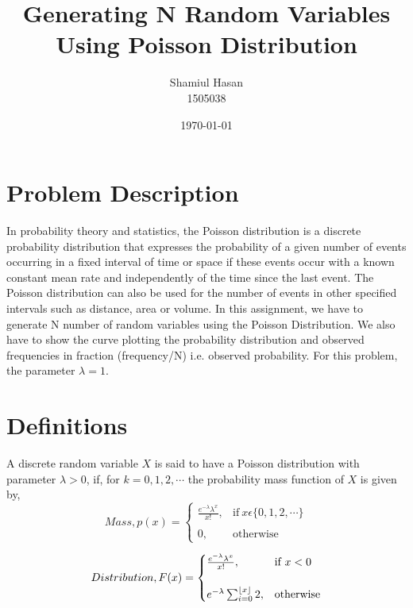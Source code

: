 \documentclass[12pt]{article}
\DeclarePairedDelimiter\floor{\lfloor}{\rfloor}
\begin{document}
\title{Generating N Random Variables Using Poisson Distribution}
\author{Shamiul Hasan\\1505038}
\date{\today}
\maketitle


\section{Problem Description}
In probability theory and statistics, the Poisson distribution is a discrete probability distribution that expresses the probability of a given number of events occurring in a fixed interval of time or space if these events occur with a known constant mean rate and independently of the time since the last event. The Poisson distribution can also be used for the number of events in other specified intervals such as distance, area or volume.
In this assignment, we have to generate N number of random variables using the Poisson Distribution. We also have to show the curve plotting the probability distribution and observed frequencies in fraction (frequency/N) i.e. observed probability. For this problem, the parameter $\lambda = 1$.


\section{Definitions}

A discrete random variable $X$ is said to have a Poisson distribution with parameter $\lambda > 0$, if, for $k = 0, 1, 2, \cdots$ the probability mass function of $X$ is given by, \\

\begin{equation}
	Mass, p(x)=
	\begin{cases}
		{\frac {e^{-\lambda}\lambda ^{x}}{x!}}, & \text{if}\ x \epsilon \{0,1,2,\cdots\} \\ \\
		0,                                      & \text{otherwise}
	\end{cases}
\end{equation}


\begin{equation}
	Distribution,F(x)=
	\begin{cases}
		{\frac {e^{-\lambda}\lambda ^{x}}{x!}}, & \text{if}\ x < 0 \\ \\
		e^{-\lambda}\sum_{i=0}^{\floor*{x}}2,   & \text{otherwise}
	\end{cases}
\end{equation}
\end{document}
